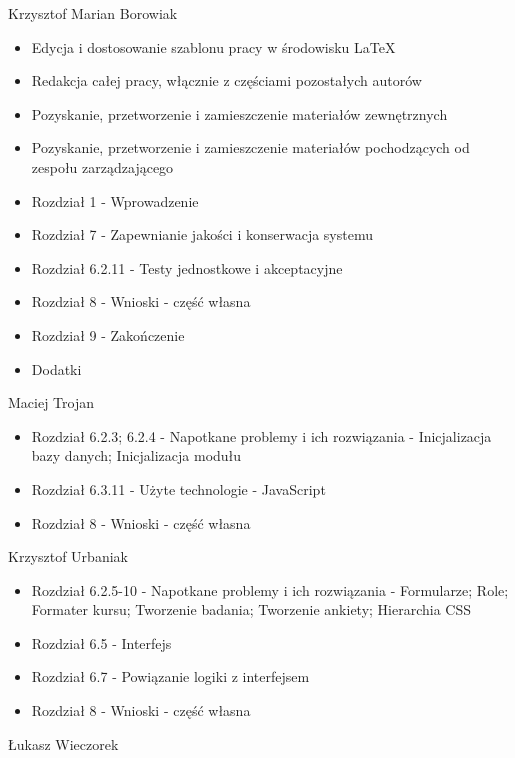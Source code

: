 \begin{description}
\item Krzysztof Marian Borowiak

\begin{itemize}
\item Edycja i dostosowanie szablonu pracy w środowisku \LaTeX
\item Redakcja całej pracy, włącznie z częściami pozostałych autorów
\item Pozyskanie, przetworzenie i zamieszczenie materiałów zewnętrznych
\item Pozyskanie, przetworzenie i zamieszczenie materiałów pochodzących od zespołu zarządzającego
\item Rozdział 1 - Wprowadzenie
\item Rozdział 7 - Zapewnianie jakości i konserwacja systemu
\item Rozdział 6.2.11 - Testy jednostkowe i akceptacyjne
\item Rozdział 8 - Wnioski - część własna
\item Rozdział 9 - Zakończenie
\item Dodatki
\end{itemize}
\noindent

\item Maciej Trojan

\begin{itemize}
\item Rozdział 6.2.3; 6.2.4 - Napotkane problemy i ich rozwiązania - Inicjalizacja bazy danych; Inicjalizacja modułu
\item Rozdział 6.3.11 - Użyte technologie - JavaScript
\item Rozdział 8 - Wnioski - część własna
\end{itemize}
\noindent

\item Krzysztof Urbaniak

\begin{itemize}
\item Rozdział 6.2.5-10 - Napotkane problemy i ich rozwiązania - Formularze; Role; Formater kursu; Tworzenie badania; Tworzenie ankiety; Hierarchia CSS
\item Rozdział 6.5 - Interfejs
\item Rozdział 6.7 - Powiązanie logiki z interfejsem
\item Rozdział 8 - Wnioski - część własna
\end{itemize}
\noindent

\item Łukasz Wieczorek


\end{description}
